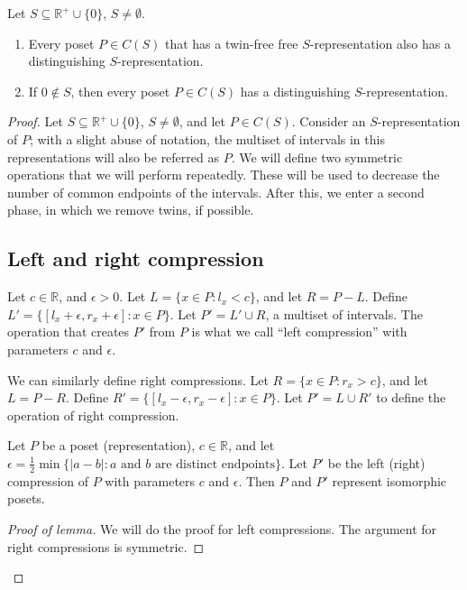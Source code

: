 \begin{theorem}\label{thm:representations}
Let $S\subseteq\mathbb{R}^+\cup\{0\}$, $S\neq\emptyset$.
\begin{enumerate}
\item\label{part:1} Every poset $P\in C(S)$ that has a twin-free free $S$-representation also has a distinguishing $S$-representation.
\item\label{part:2} If $0\not\in S$, then every poset $P\in C(S)$ has a distinguishing $S$-representation.
\end{enumerate} 
\end{theorem}

\begin{proof}
Let $S\subseteq\mathbb{R}^+\cup\{0\}$, $S\neq\emptyset$, and let $P \in C(S)$. Consider an $S$-representation of $P$; with a slight abuse of notation, the multiset of intervals in this representations will also be referred as $P$. We will define two symmetric operations that we will perform repeatedly. These will be used to decrease the number of common endpoints of the intervals. After this, we enter a second phase, in which we remove twins, if possible.

\subsection*{Left and right compression}

Let $c\in\mathbb{R}$, and $\epsilon>0$. Let $L=\{x\in P: l_x<c\}$, and let $R=P-L$. Define $L'=\{[l_x+\epsilon,r_x+\epsilon]:x\in P\}$. Let $P'=L'\cup R$, a multiset of intervals. The operation that creates $P'$ from $P$ is what we call ``left compression'' with parameters $c$ and $\epsilon$.

We can similarly define right compressions. Let $R=\{x\in P: r_x>c\}$, and let $L=P-R$. Define $R'=\{[l_x-\epsilon,r_x-\epsilon]:x\in P\}$. Let $P'=L\cup R'$ to define the operation of right compression.

\begin{lemma}
Let $P$ be a poset (representation), $c\in\mathbb{R}$, and let $\epsilon=\frac12\min\{|a-b|:\text{$a$ and $b$ are distinct endpoints}\}$. Let $P'$ be the left (right) compression of $P$ with parameters $c$ and $\epsilon$. Then $P$ and $P'$ represent isomorphic posets.
\end{lemma}

\begin{proof}[Proof of lemma]
We will do the proof for left compressions. The argument for right compressions is symmetric.


\end{proof}
\end{proof}
